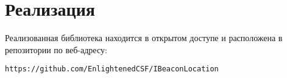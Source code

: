 \section{Реализация}

Реализованная библиотека находится в открытом доступе и расположена в репозитории по веб-адресу:
\begin{center}
    \texttt{https://github.com/EnlightenedCSF/IBeaconLocation}
\end{center}